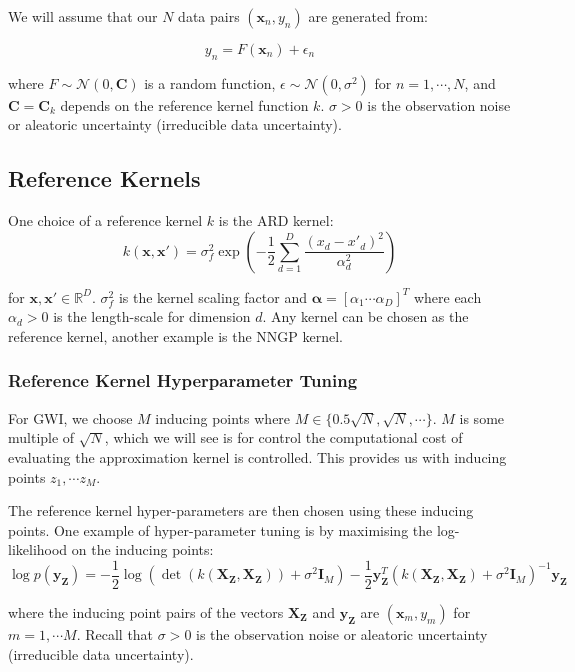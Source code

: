 \documentclass[twoside,11pt]{article}
\begin{document}
We will assume that our $N$ data pairs $(\mathbf{x}_n, y_n)$ are generated from:

\[y_n = F(\mathbf{x}_n) + \epsilon_n\]

where $F \sim \mathcal{N}(0, \mathbf{C})$ is a random function, $\epsilon \sim \mathcal{N}(0, \sigma^2)$ for $n=1, \cdots, N$, and $\mathbf{C} = \mathbf{C}_{k}$ depends on the reference kernel function $k$.
$\sigma >0$ is the observation noise or aleatoric uncertainty (irreducible data uncertainty).

\subsection{Reference Kernels}

One choice of a reference kernel $k$ is the ARD kernel:
\[k(\mathbf{x}, \mathbf{x}') = \sigma_f^2 \exp\left( - \frac{1}{2} \sum_{d=1}^D \frac{(x_d - x'_d)^2}{\alpha_d^2}\right)\]

for $\mathbf{x}, \mathbf{x}' \in \mathbb{R}^D$. $\sigma_f^2$ is the kernel scaling factor and $\mathbf{\alpha} = [\alpha_1 \cdots \alpha_D]^T$ where each $\alpha_d > 0$ is the length-scale for dimension $d$.
Any kernel can be chosen as the reference kernel, another example is the NNGP kernel.

\subsubsection{Reference Kernel Hyperparameter Tuning}
For GWI, we choose $M$ inducing points where $M \in \{0.5\sqrt{N}, \sqrt{N},\cdots\}$.
$M$ is some multiple of $\sqrt{N}$, which we will see is for control the computational cost of evaluating the approximation kernel is controlled.
This provides us with inducing points $z_1, \cdots z_M$.

The reference kernel hyper-parameters are then chosen using these inducing points.
One example of hyper-parameter tuning is by maximising the log-likelihood on the inducing points:
\[\log p(\mathbf{y}_{\mathbf{Z}}) = -\frac{1}{2}\log\left( \det (k(\mathbf{X}_{\mathbf{Z}}, \mathbf{X}_{\mathbf{Z}})) + \sigma^2 \mathbf{I}_M\right) - \frac{1}{2} \mathbf{y}_{\mathbf{Z}}^T\left(k(\mathbf{X}_{\mathbf{Z}}, \mathbf{X}_{\mathbf{Z}}) + \sigma^2 \mathbf{I}_M\right)^{-1} \mathbf{y}_{\mathbf{Z}}\]

where the inducing point pairs of the vectors $\mathbf{X}_{\mathbf{Z}}$ and $\mathbf{y}_{\mathbf{Z}}$ are $(\mathbf{x}_m, y_m)$ for $m=1,\cdots M$.
Recall that $\sigma >0$ is the observation noise or aleatoric uncertainty (irreducible data uncertainty).
\end{document}
